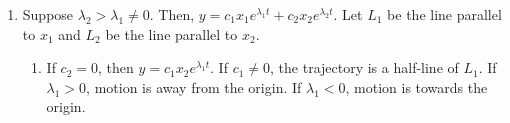 \documentclass[12pt, a4paper]{article}
\begin{document}
\begin{itemize}
\begin{enumerate}
\begin{figure}[H]
		\end{figure}
		\item Suppose $\lambda_2>\lambda_1\neq0$. Then, $y=c_1x_1e^{\lambda_1t}+c_2x_2e^{\lambda_2t}$. Let $L_1$ be the line parallel to $x_1$ and $L_2$ be the line parallel to $x_2$.
		\begin{enumerate}
			\item If $c_2=0$, then $y=c_1x_2e^{\lambda_1t}$. If $c_1\neq0$, the trajectory is a half-line of $L_1$. If $\lambda_1>0$, motion is away from the origin. If $\lambda_1<0$, motion is towards the origin. 
			\begin{figure}[H]\centering
			\hfill
			\hfill
			\hfill

\end{figure}
\end{enumerate}
\end{enumerate}
\end{itemize}
\end{document}
